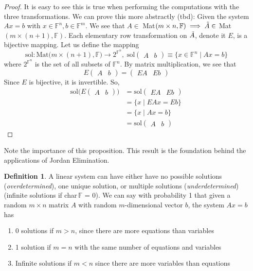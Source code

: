 \documentclass{article}
\theoremstyle{remark}
\theoremstyle{definition}
\newtheorem{definition}{Definition}[section]
\begin{document}
    \begin{proof}
    It is easy to see this is true when performing the computations with the three transformations. We can prove this more abstractly (tbd): Given the system $A x = b$ with $x \in \mathbb{F}^n, b \in \mathbb{F}^m$. We see that $A \in $ Mat$(m \times n, \mathbb{F}) \implies \Tilde{A} \in$ Mat$(m \times (n+1), \mathbb{F})$. Each elementary row transformation on $\Tilde{A}$, denote it $E$, is a bijective mapping. Let us define the mapping 
    \[\text{sol}: \text{Mat}\big( m \times (n+1), \mathbb{F} \big) \longrightarrow 2^{\mathbb{F}^n}, \; \text{sol} \begin{pmatrix}
    A & b
    \end{pmatrix} \equiv \{ x\in \mathbb{F}^n \; | \; A x = b\} \]
    where $2^{\mathbb{F}^n}$ is the set of all subsets of $\mathbb{F}^n$. By matrix multiplication, we see that 
    \[ E \begin{pmatrix}
    A & b
    \end{pmatrix} = \begin{pmatrix}
    E A & E b
    \end{pmatrix}\]
    Since $E$ is bijective, it is invertible. So, 
    \begin{align*} 
    \text{sol} \big( E \begin{pmatrix}
    A & b \end{pmatrix} \big) & = \text{sol} \begin{pmatrix}
    E A & E b \end{pmatrix} \\ 
    & = \{ x \; | \; E A x = E b\} \\ 
    & = \{ x \; | \; A x = b\} \\ 
    & = \text{sol} \begin{pmatrix} A & b \end{pmatrix}
    \end{align*}
    \end{proof}

    Note the importance of this proposition. This result is the foundation behind the applications of Jordan Elimination.

    \begin{definition}
    A linear system can have either have no possible solutions (\textit{overdetermined}), one unique solution, or multiple solutions (\textit{underdetermined}) (infinite solutions if char$\, \mathbb{F}$ = 0). We can say with probability 1 that given a random $m \times n$ matrix $A$ with random $m$-dimensional vector $b$, the system $A x = b$ has
    \begin{enumerate}
        \item 0 solutions if $m > n$, since there are more equations than variables
        \item 1 solution if $m = n$ with the same number of equations and variables
        \item Infinite solutions if $m < n$ since there are more variables than equations
    \end{enumerate}
    \end{definition}
\end{document}

